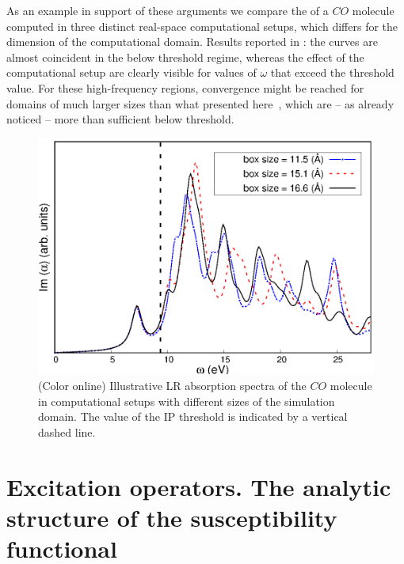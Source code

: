 \documentclass[reprint,aps,prb]{revtex4-1}
\begin{document}
As an example in support of these arguments we compare the  of a $CO$ molecule computed in three distinct real-space computational setups, which differs for the dimension of the computational domain.
Results reported in : the curves are almost coincident in the below threshold regime,
whereas the effect of the computational setup are clearly visible for values of $\omega$ that exceed the threshold value.
For these high-frequency regions, convergence might be reached for domains of much larger sizes than what presented here~\cite{baroni2008},
which are -- as already noticed -- more than sufficient below threshold.

\begin{figure}
\includegraphics[scale=0.6]{Fig2_CO_spectrum.eps}
\caption{\label{co_spectrum}(Color online) Illustrative LR absorption spectra of the $CO$ molecule in computational setups with different sizes of the simulation domain. The value of the IP threshold is indicated by a vertical dashed line.}
\end{figure}

\section{Excitation operators. The analytic structure of the susceptibility functional}
\end{document}
